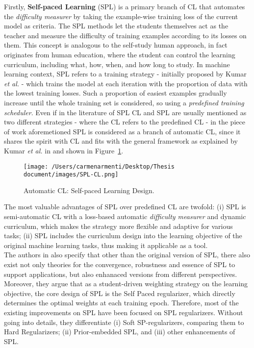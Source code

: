 Firstly, \textbf{Self-paced Learning} (SPL) is a primary branch of CL that automates the \textit{difficulty measurer}
by taking the example-wise training loss of the current model as criteria. The SPL methods let the students themselves
act as the teacher and measure the difficulty of training examples according to its losses on them. 
This concept is analogous to the self-study human approach, in fact
originates from human education, where the student can control the learning curriculum, including what, how, when, and how long 
to study. In machine learning context, SPL refers to a training strategy - initially proposed by Kumar \textit{et al.} \cite{kumar2010self} -
which trains the model at each iteration with the proportion of data with the lowest training losses.
Such a proportion of easiest examples gradually increase until the whole training set is considered, so using a \textit{predefined training scheduler}.
Even if in the literature of SPL CL and SPL are usually mentioned as two different strategies - where the CL 
refers to the predefined CL - in the piece of work aforemetioned SPL is considered as a branch of automatic CL, since it shares 
the spirit with CL and fits with the general framework as explained by Kumar \textit{et al.} in \cite{kumar2010self} and shown in Figure~\ref{fig:SPL-CL}.
\begin{figure}[h]
    \begin{center}
        \texttt{[image: /Users/carmenarmenti/Desktop/Thesis document/images/SPL-CL.png]}
        \caption{\label{fig:SPL-CL}Automatic CL: Self-paced Learning Design.}
    \end{center}
\end{figure}
The most valuable advantages of SPL over predefined CL are twofold: (i) SPL is semi-automatic CL 
with a loss-based automatic \textit{difficulty measurer} and dynamic curriculum, which makes the strategy more flexible and adaptive for various tasks; (ii) SPL includes the curriculum
design into the learning objective of the original machine learning tasks, thus making it applicable as a tool.\\
The authors in \cite{wang2021survey} also specify that other than the original version of SPL, there also exist not only theories for the 
convergence, robustness and essence of SPL to support applications, but also enhanaced versions from different 
perspectives. Moreover, they argue that as a student-driven weighting strategy on the learning objective, the core 
design of SPL is the Self Paced regularizer, which directly determines the optimal weights at each training epoch. Therefore,
most of the existing improvements on SPL have been focused on SPL regularizers. Without going into details, they differentiate (i) Soft SP-regularizers, 
comparing them to Hard Regularizers; (ii) Prior-embedded SPL, and (iii) other enhancements of SPL.

